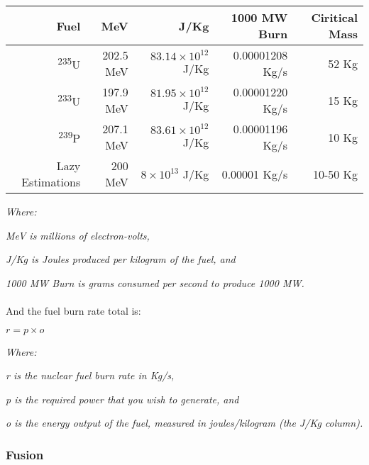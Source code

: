 \vspace{1\baselineskip}
\begin{tabular}{| r | r | r | r | r |}

\hline

Fuel & MeV & J/Kg & 1000 MW Burn & Ciritical Mass \\

\hline

\textsuperscript{235}U & 202.5 MeV & $83.14 \times 10^{12}$ J/Kg & 0.00001208 Kg/s & 52 Kg \\

\textsuperscript{233}U & 197.9 MeV & $81.95 \times 10^{12}$ J/Kg & 0.00001220 Kg/s & 15 Kg \\

\textsuperscript{239}P & 207.1 MeV & $83.61 \times 10^{12}$ J/Kg & 0.00001196 Kg/s & 10 Kg \\

Lazy Estimations & 200 MeV & $8 \times 10^{13}$ J/Kg & 0.00001 Kg/s & 10-50 Kg \\

\hline

\end{tabular}
\vspace{1\baselineskip}

\par
\textit{Where:}
\par
\textit{MeV is millions of electron-volts,}
\par
\textit{J/Kg is Joules produced per kilogram of the fuel, and}
\par
\textit{1000 MW Burn is grams consumed per second to produce 1000 MW.}

\paragraph{}
And the fuel burn rate total is:

$r = p \times o$

\par
\textit{Where:}
\par
\textit{r is the nuclear fuel burn rate in Kg/s,}
\par
\textit{p is the required power that you wish to generate, and}
\par
\textit{o is the energy output of the fuel, measured in joules/kilogram (the J/Kg column).}

\subsubsection{Fusion}

